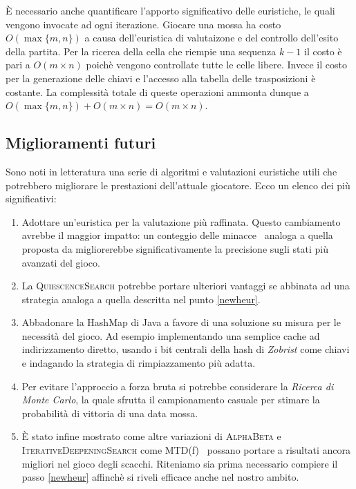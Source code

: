 \documentclass{article}
\begin{document}
\`E necessario anche quantificare l'apporto significativo delle euristiche,
le quali vengono invocate ad ogni iterazione. Giocare una mossa ha costo
$O(\max\{m, n\})$ a causa dell'euristica di valutaizone e del controllo
dell'esito della partita. Per la ricerca della cella che riempie una sequenza
$k-1$ il costo \`e pari a $O(m \times n)$ poich\`e vengono controllate tutte le celle libere.
Invece il costo per la generazione delle chiavi e l'accesso alla tabella delle
trasposizioni \`e costante. La complessit\`a totale di queste operazioni
ammonta dunque a $O(\max\{m,n\}) + O(m \times n) = O(m \times n)$.
\subsection{Miglioramenti futuri}

Sono noti in letteratura una serie di algoritmi e valutazioni euristiche utili
che potrebbero migliorare le prestazioni
dell'attuale giocatore. Ecco un elenco dei pi\`u significativi:
\begin{enumerate}
  \item Adottare un'euristica per la valutazione pi\`u raffinata. Questo cambiamento
    avrebbe il maggior impatto: un conteggio delle minacce~\cite{heur}
    analoga a quella proposta da \citeauthor{heur} migliorerebbe significativamente
    la precisione sugli stati pi\`u avanzati del gioco. \label{newheur}
  \item La \textsc{QuiescenceSearch} potrebbe portare ulteriori vantaggi se
    abbinata ad una strategia analoga a quella descritta nel punto \vref{newheur}.
  \item Abbadonare la HashMap di Java a favore di una soluzione su misura
    per le necessit\`a del gioco. Ad esempio implementando una semplice cache
    ad indirizzamento diretto, usando i bit centrali della hash di \emph{Zobrist}
    come chiavi e indagando la strategia di rimpiazzamento pi\`u adatta.
  \item Per evitare l'approccio a forza bruta si potrebbe considerare
    la \emph{Ricerca di Monte Carlo}, la quale sfrutta il campionamento casuale
    per stimare la probabilit\`a di vittoria di una data mossa.
  \item \`E stato infine mostrato come altre variazioni di \textsc{AlphaBeta} e
    \textsc{IterativeDeepeningSearch} come MTD(f)~\cite{mtdf} possano portare a
    risultati ancora migliori nel gioco degli scacchi. Riteniamo sia prima
    necessario compiere il passo \vref{newheur} affinch\`e si riveli efficace anche nel nostro ambito.
\end{enumerate}

\pagebreak


\end{document}
